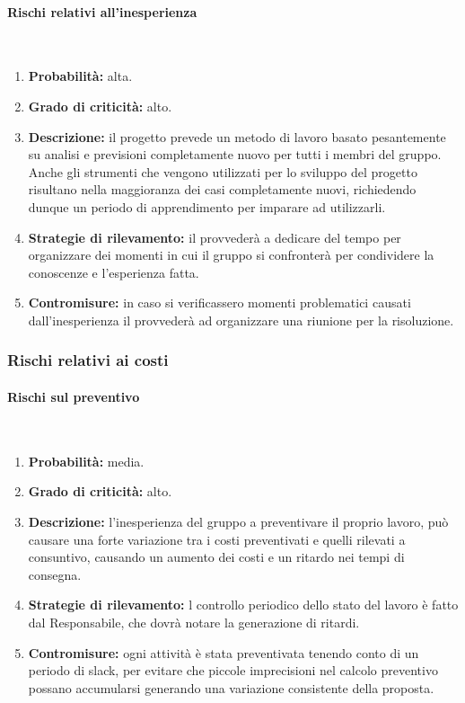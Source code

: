 \paragraph{Rischi relativi all'inesperienza}\mbox{}\\
\begin{enumerate}
	\item \textbf{Probabilità:} alta.
	\item \textbf{Grado di criticità:} alto.
	\item \textbf{Descrizione:} il progetto prevede un metodo di lavoro basato pesantemente su analisi e previsioni completamente nuovo per tutti i membri del gruppo. Anche gli strumenti che vengono utilizzati per lo sviluppo del progetto risultano nella maggioranza dei casi completamente nuovi, richiedendo dunque un periodo di apprendimento per imparare ad utilizzarli.
	\item \textbf{Strategie di rilevamento:} il \Responsabile{} provvederà a dedicare del tempo per organizzare dei momenti in cui il gruppo si confronterà per condividere la conoscenze e l'esperienza fatta.
	\item \textbf{Contromisure:} in caso si verificassero momenti problematici causati dall'inesperienza il \Responsabile{} provvederà ad organizzare una riunione per la risoluzione.
\end{enumerate}

\subsubsection{Rischi relativi ai costi}
\paragraph{Rischi sul preventivo}\mbox{}\\
\begin{enumerate}
	\item \textbf{Probabilità:} media.
	\item \textbf{Grado di criticità:} alto.
	\item \textbf{Descrizione:} l’inesperienza del gruppo a preventivare il proprio lavoro, può causare una forte variazione tra i costi preventivati e quelli rilevati a consuntivo, causando un aumento dei costi e un ritardo nei tempi di consegna.
	\item \textbf{Strategie di rilevamento:} l controllo periodico dello stato del lavoro è fatto dal Responsabile, che dovrà notare la generazione di ritardi.
	\item \textbf{Contromisure:} ogni attività è stata preventivata tenendo conto di un periodo di slack, per evitare che piccole imprecisioni nel calcolo preventivo possano accumularsi generando una variazione consistente della proposta.
\end{enumerate}



